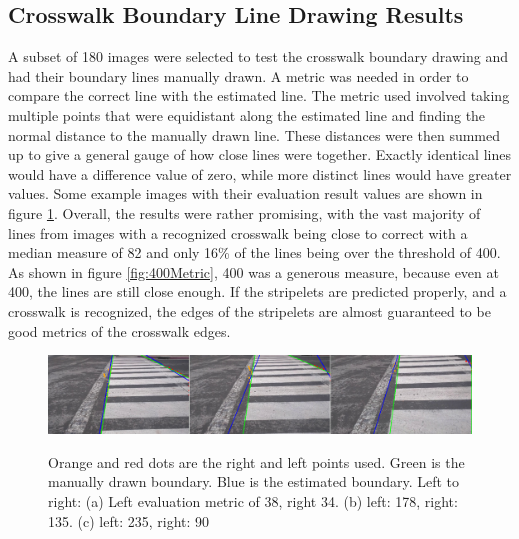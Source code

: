 \documentclass[12pt]{ucthesis}
\newcommand{\captionfonts}{\small\bf\ssp}
\begin{document}
\subsection{Crosswalk Boundary Line Drawing Results}

A subset of 180 images were selected to test the crosswalk boundary drawing and had their boundary lines manually drawn. A metric was needed in order to compare the correct line with the estimated line. The metric used involved taking multiple points that were equidistant along the estimated line and finding the normal distance to the manually drawn line. These distances were then summed up to give a general gauge of how close lines were together. Exactly identical lines would have a difference value of zero, while more distinct lines would have greater values. Some example images with their evaluation result values are shown in figure \ref{fig:LinesUsingJustGoodStartAndEnds2}. Overall, the results were rather promising, with the vast majority of lines from images with a recognized crosswalk being close to correct with a median measure of 82 and only 16\% of the lines being over the threshold of 400. As shown in figure \ref{fig:400Metric}, 400 was a generous measure, because even at 400, the lines are still close enough.  If the stripelets are predicted properly, and a crosswalk is recognized, the edges of the stripelets are almost guaranteed to be good metrics of the crosswalk edges.

\begin{figure}[t]
\begin{center}
\includegraphics[width=15cm]{LinesUsingJustGoodStartAndEnds2.png}
\captionfonts
\caption[Boundary Line Estimation Results]{Orange and red dots are the right and left points used. Green is the manually drawn boundary. Blue is the estimated boundary. Left to right: (a) Left evaluation metric of 38, right 34. (b) left: 178, right: 135. (c) left: 235, right: 90}
\label{fig:LinesUsingJustGoodStartAndEnds2}
\end{center}
\end{figure}
\end{document}
